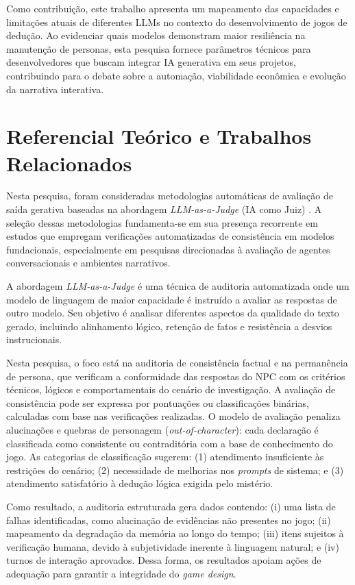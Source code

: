 \documentclass[12pt]{article}
\begin{document}
Como contribuição, este trabalho apresenta um mapeamento das capacidades e limitações atuais de diferentes LLMs no contexto do desenvolvimento de jogos de dedução. Ao evidenciar quais modelos demonstram maior resiliência na manutenção de personas, esta pesquisa fornece parâmetros técnicos para desenvolvedores que buscam integrar IA generativa em seus projetos, contribuindo para o debate sobre a automação, viabilidade econômica e evolução da narrativa interativa.

\section{Referencial Teórico e Trabalhos Relacionados} 
\label{sec:referenciaTeorico}

Nesta pesquisa, foram consideradas metodologias automáticas de avaliação de saída gerativa baseadas na abordagem \textit{LLM-as-a-Judge} (IA como Juiz) \cite{zheng2023judging}. A seleção dessas metodologias fundamenta-se em sua presença recorrente em estudos que empregam verificações automatizadas de consistência em modelos fundacionais, especialmente em pesquisas direcionadas à avaliação de agentes conversacionais e ambientes narrativos.

A abordagem \textit{LLM-as-a-Judge} \cite{zheng2023judging} é uma técnica de auditoria automatizada onde um modelo de linguagem de maior capacidade é instruído a avaliar as respostas de outro modelo. Seu objetivo é analisar diferentes aspectos da qualidade do texto gerado, incluindo alinhamento lógico, retenção de fatos e resistência a desvios instrucionais.

Nesta pesquisa, o foco está na auditoria de consistência factual e na permanência de persona, que verificam a conformidade das respostas do NPC com os critérios técnicos, lógicos e comportamentais do cenário de investigação. A avaliação de consistência pode ser expressa por pontuações ou classificações binárias, calculadas com base nas verificações realizadas. O modelo de avaliação penaliza alucinações e quebras de personagem (\textit{out-of-character}): cada declaração é classificada como consistente ou contraditória com a base de conhecimento do jogo. As categorias de classificação sugerem: (1) atendimento insuficiente às restrições do cenário; (2) necessidade de melhorias nos \textit{prompts} de sistema; e (3) atendimento satisfatório à dedução lógica exigida pelo mistério.

Como resultado, a auditoria estruturada gera dados contendo: (i) uma lista de falhas identificadas, como alucinação de evidências não presentes no jogo; (ii) mapeamento da degradação da memória ao longo do tempo; (iii) itens sujeitos à verificação humana, devido à subjetividade inerente à linguagem natural; e (iv) turnos de interação aprovados. Dessa forma, os resultados apoiam ações de adequação para garantir a integridade do \textit{game design}.
\end{document}
